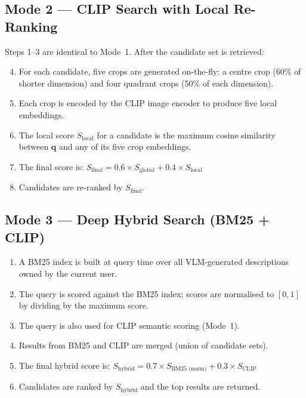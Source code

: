 \documentclass[12pt,a4paper,oneside]{report}
\begin{document}
\subsection{Mode 2 — CLIP Search with Local Re-Ranking}

Steps 1–3 are identical to Mode~1.  After the candidate set is retrieved:

\begin{enumerate}[leftmargin=*]
  \setcounter{enumi}{3}
  \item For each candidate, five crops are generated on-the-fly: a centre
        crop (60\% of shorter dimension) and four quadrant crops (50\%
        of each dimension).
  \item Each crop is encoded by the CLIP image encoder to produce
        five local embeddings.
  \item The local score $S_{\text{local}}$ for a candidate is the maximum
        cosine similarity between $\mathbf{q}$ and any of its five crop
        embeddings.
  \item The final score is:
        $S_{\text{final}} = 0.6 \times S_{\text{global}}
                           + 0.4 \times S_{\text{local}}$
  \item Candidates are re-ranked by $S_{\text{final}}$.
\end{enumerate}

\subsection{Mode 3 — Deep Hybrid Search (BM25 + CLIP)}

\begin{enumerate}[leftmargin=*]
  \item A BM25 index is built at query time over all VLM-generated
        descriptions owned by the current user.
  \item The query is scored against the BM25 index; scores are
        normalised to $[0, 1]$ by dividing by the maximum score.
  \item The query is also used for CLIP semantic scoring (Mode~1).
  \item Results from BM25 and CLIP are merged (union of candidate sets).
  \item The final hybrid score is:
        $S_{\text{hybrid}} = 0.7 \times S_{\text{BM25 (norm)}}
                           + 0.3 \times S_{\text{CLIP}}$
  \item Candidates are ranked by $S_{\text{hybrid}}$ and the top results
        are returned.
\end{enumerate}
\end{document}
